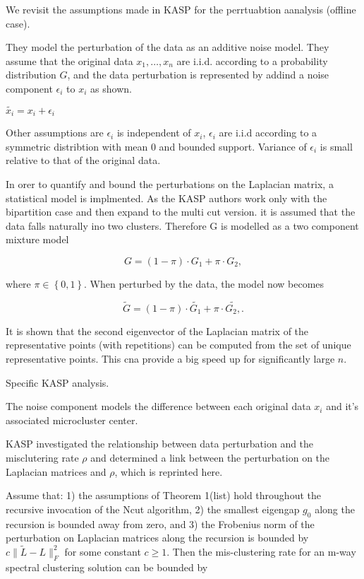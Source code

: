 \documentclass[a4document]{article}		%
\begin{document}
We revisit the assumptions made in KASP for the perrtuabtion aanalysis (offline case). 

They model the perturbation of the data as an additive noise model. They assume that the original data $x_1, \ldots, x_n$ are i.i.d. according to a probability distribution $G$, and the data perturbation is represented by addind a noise component $\epsilon_i$ to $x_i$ as shown. 

$\tilde{x_i} = x_i + \epsilon_i$

Other assumptions are $\epsilon_i$ is independent of $x_i$, $\epsilon_i$ are i.i.d according to a symmetric distribtion with mean 0 and bounded support. Variance of $\epsilon_i$ is small relative to that of the original data. 

In orer to quantify and bound the perturbations on the Laplacian matrix, a statistical model is implmented. As the KASP authors work only with the bipartition case and then expand to the multi cut version. it is assumed that the data falls naturally ino two clusters. Therefore G is modelled as a two component mixture model

\begin{equation}
  G = (1 - \pi) \cdot G_1 + \pi \cdot G_2,
\end{equation}

where $\pi \in \left\{0,1\right\}$. When perturbed by the data, the model now becomes

\begin{equation}
  \tilde{G} = (1 - \pi) \cdot \tilde{G_1} + \pi \cdot \tilde{G_2,}.
\end{equation}
 

It is shown that the second eigenvector of the Laplacian matrix of the representative points (with repetitions) can be computed from the set of unique representative points. This cna provide a big speed up for significantly large $n$. 

Specific KASP analysis. 

The noise component models the difference between each original data  $x_i$ and it's associated microcluster center. 

KASP investigated the relationship between data perturbation and the misclutering rate $\rho$ and determined a link between the perturbation on the Laplacian matrices and $\rho$, which is reprinted here. 

Assume that: 1) the assumptions of Theorem 1(list) hold throughout the recursive invocation of the Ncut algorithm, 2) the smallest eigengap
$g_0$ along the recursion is bounded away from zero, and 3) the Frobenius norm of the perturbation on Laplacian matrices along the recursion is bounded by $c\|\tilde{L} - L\|_F^2$ for some constant $c \geq 1$. Then the mis-clustering rate for an m-way spectral clustering solution can be bounded by
\end{document}
